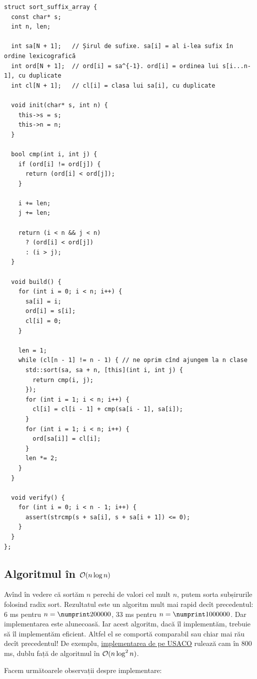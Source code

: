\documentclass[../main.tex]{subfiles}
\begin{document}
\begin{verbatim}
struct sort_suffix_array {
  const char* s;
  int n, len;

  int sa[N + 1];   // Șirul de sufixe. sa[i] = al i-lea sufix în ordine lexicografică
  int ord[N + 1];  // ord[i] = sa^{-1}. ord[i] = ordinea lui s[i...n-1], cu duplicate
  int cl[N + 1];   // cl[i] = clasa lui sa[i], cu duplicate

  void init(char* s, int n) {
    this->s = s;
    this->n = n;
  }

  bool cmp(int i, int j) {
    if (ord[i] != ord[j]) {
      return (ord[i] < ord[j]);
    }

    i += len;
    j += len;

    return (i < n && j < n)
      ? (ord[i] < ord[j])
      : (i > j);
  }

  void build() {
    for (int i = 0; i < n; i++) {
      sa[i] = i;
      ord[i] = s[i];
      cl[i] = 0;
    }

    len = 1;
    while (cl[n - 1] != n - 1) { // ne oprim cînd ajungem la n clase
      std::sort(sa, sa + n, [this](int i, int j) {
        return cmp(i, j);
      });
      for (int i = 1; i < n; i++) {
        cl[i] = cl[i - 1] + cmp(sa[i - 1], sa[i]);
      }
      for (int i = 1; i < n; i++) {
        ord[sa[i]] = cl[i];
      }
      len *= 2;
    }
  }

  void verify() {
    for (int i = 0; i < n - 1; i++) {
      assert(strcmp(s + sa[i], s + sa[i + 1]) <= 0);
    }
  }
};
\end{verbatim}

\subsection{Algoritmul în \texorpdfstring{$\mathcal{O}(n \log n)$}{O(n log n)}}

Avînd în vedere că sortăm $n$ perechi de valori cel mult $n$, putem sorta subșirurile folosind radix sort. Rezultatul este un algoritm mult mai rapid decît precedentul: 6 ms pentru $n = \np{200000}$, 33 ms pentru $n = \np{1000000}$. Dar implementarea este alunecoasă. Iar acest algoritm, dacă îl implementăm, trebuie să îl implementăm eficient. Altfel el se comportă comparabil sau chiar mai rău decît precedentul! De exemplu, \href{https://usaco.guide/adv/suffix-array?lang=cpp}{implementarea de pe USACO} rulează cam în 800 ms, dublu față de algoritmul în $\mathcal{O}(n \log^2 n)$.

Facem următoarele observații despre implementare:
\end{document}
